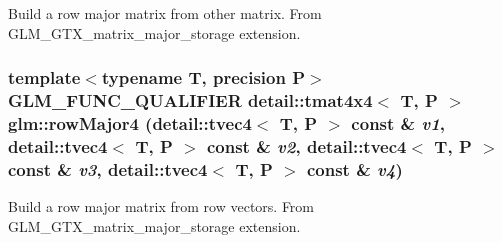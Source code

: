 Build a row major matrix from other matrix. From GLM\_\-GTX\_\-matrix\_\-major\_\-storage extension. \hypertarget{group__gtx__matrix__major__storage_g8d22c54daf5c593c1285c54d1439eead}{
\subsubsection[rowMajor4]{\setlength{\rightskip}{0pt plus 5cm}template$<$typename T, precision P$>$ GLM\_\-FUNC\_\-QUALIFIER detail::tmat4x4$<$ T, P $>$ glm::rowMajor4 (detail::tvec4$<$ T, P $>$ const \& {\em v1}, \/  detail::tvec4$<$ T, P $>$ const \& {\em v2}, \/  detail::tvec4$<$ T, P $>$ const \& {\em v3}, \/  detail::tvec4$<$ T, P $>$ const \& {\em v4})}}
\label{group__gtx__matrix__major__storage_g8d22c54daf5c593c1285c54d1439eead}


Build a row major matrix from row vectors. From GLM\_\-GTX\_\-matrix\_\-major\_\-storage extension. 